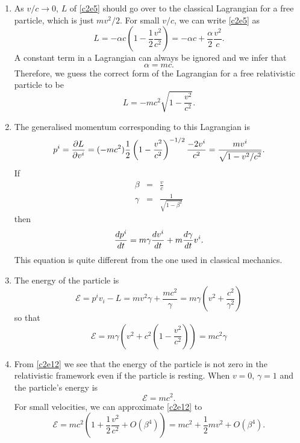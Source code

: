 \begin{enumerate}
\item As $v/c \rightarrow 0$, $L$ of \eqref{c2e5} should go over to the classical
Lagrangian for a free particle, which is just $mv^2/2$. For small $v/c$, we can
write \eqref{c2e5} as
\[
L = -\alpha c\left(1 - \frac{1}{2}\frac{v^2}{c^2}\right) = 
-\alpha c + \frac{\alpha}{2}\frac{v^2}{c}.
\]
A constant term in a Lagrangian can always be ignored and we infer that
\begin{equation}\label{c2e6}
\alpha = mc.
\end{equation}
Therefore, we guess the correct form of the Lagrangian for a free relativistic
particle to be
\begin{equation}\label{c2e7}
L = -mc^2\sqrt{1 - \frac{v^2}{c^2}}.
\end{equation}

\item The generalised momentum corresponding to this Lagrangian is
\begin{equation}\label{c2e8}
p^i = \frac{\partial{L}}{\partial{v^i}} = (-mc^2)\frac{1}{2}\left(1 - \frac{v^2}{c^2}\right)^{-1/2}\frac{-2v^i}{c^2}
= \frac{mv^i}{\sqrt{1 - v^2/c^2}}.
\end{equation}
If
\begin{eqnarray}
\beta &=& \frac{v}{c} \\ \label{c2e9}
\gamma &=& \frac{1}{\sqrt{1 - \beta^2}} \label{c2e10}
\end{eqnarray}
then
\begin{equation}\label{c2e11}
\frac{d{p^i}}{d{t}} = m\gamma \frac{d{v^i}}{d{t}} + m\frac{d{\gamma}}{d{t}}v^i.
\end{equation}
This equation is quite different from the one used in classical mechanics.

\item The energy of the particle is
\[
\mathcal{E} = p^i v_i - L = mv^2\gamma + \frac{mc^2}{\gamma} = m\gamma\left(v^2 + \frac{c^2}{\gamma^2}\right)
\]
so that
\begin{equation}\label{c2e12}
\mathcal{E} = m\gamma\left(v^2 + c^2\left(1 - \frac{v^2}{c^2}\right)\right) 
= mc^2\gamma
\end{equation}

\item From \eqref{c2e12} we see that the energy of the particle is not zero in
the relativistic framework even if the particle is resting. When $v = 0$, $\gamma
= 1$ and the particle's energy is
\begin{equation}\label{c2e13}
\mathcal{E} = mc^2.
\end{equation}
For small velocities, we can approximate \eqref{c2e12} to
\begin{equation}\label{c2e14}
\mathcal{E} = mc^2\left(1 + \frac{1}{2}\frac{v^2}{c^2} + O(\beta^4)\right) = 
mc^2 + \frac{1}{2}mv^2 + O(\beta^4).
\end{equation}


\end{enumerate}
